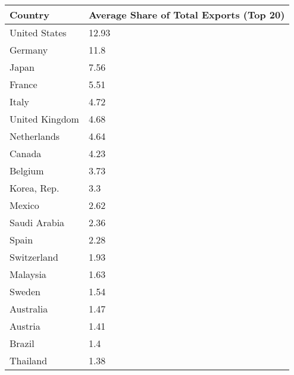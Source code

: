 \begin{table}[tbp] \centering
{}

\begin{tabularx}{\linewidth}{lC}

\toprule
{Country}&{Average Share of Total Exports (Top 20)} \tabularnewline
\midrule \addlinespace[\belowrulesep]
United States&12.93 \tabularnewline
Germany&11.8 \tabularnewline
Japan&7.56 \tabularnewline
France&5.51 \tabularnewline
Italy&4.72 \tabularnewline
United Kingdom&4.68 \tabularnewline
Netherlands&4.64 \tabularnewline
Canada&4.23 \tabularnewline
Belgium&3.73 \tabularnewline
Korea, Rep.&3.3 \tabularnewline
Mexico&2.62 \tabularnewline
Saudi Arabia&2.36 \tabularnewline
Spain&2.28 \tabularnewline
Switzerland&1.93 \tabularnewline
Malaysia&1.63 \tabularnewline
Sweden&1.54 \tabularnewline
Australia&1.47 \tabularnewline
Austria&1.41 \tabularnewline
Brazil&1.4 \tabularnewline
Thailand&1.38 \tabularnewline
\bottomrule 

\end{tabularx}
\end{table}
